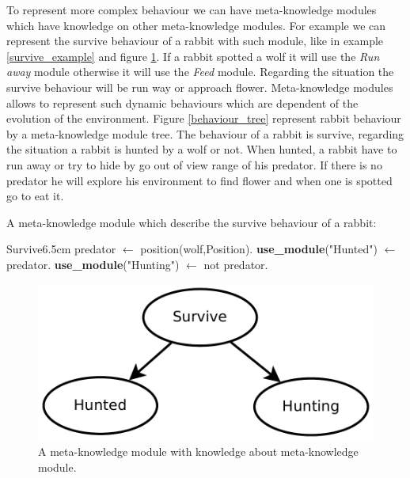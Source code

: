 \documentclass{aamas2012}
\begin{document}
	To represent more complex behaviour we can have meta-knowledge modules which have knowledge on other meta-knowledge modules.
	For example we can represent the survive behaviour of a rabbit with such module, like in example \ref{survive_example} and figure \ref{survive_figure}.
	If a rabbit spotted a wolf it will use the \emph{Run away} module otherwise it will use the \emph{Feed} module.
	Regarding the situation the survive behaviour will be run way or approach flower.
	Meta-knowledge modules allows to represent such dynamic behaviours which are dependent of the evolution of the environment.
	Figure \ref{behaviour_tree} represent rabbit behaviour by a meta-knowledge module tree.
	The behaviour of a rabbit is survive, regarding the situation a rabbit is hunted by a wolf or not.
	When hunted, a rabbit have to run away or try to hide by go out of view range of his predator.
	If there is no predator he will explore his environment to find flower and when one is spotted go to eat it.
	
	\begin{example}
		\label{survive_example}
		A meta-knowledge module which describe the survive behaviour of a rabbit:\newline
		\begin{module}{Survive}{6.5cm}
			predator $\leftarrow$ position(wolf,Position).\newline
			\textbf{use\_module}("Hunted") $\leftarrow$ predator.\newline
			\textbf{use\_module}("Hunting") $\leftarrow$ not predator.
		\end{module}
	\end{example}
	
	\begin{figure}
		\centering
		\includegraphics[keepaspectratio=true, scale=0.4]{survive.pdf}
		\caption
		{
			\label{survive_figure}
			A meta-knowledge module with knowledge about meta-knowledge module.
		}
	\end{figure}
	
\end{document}
